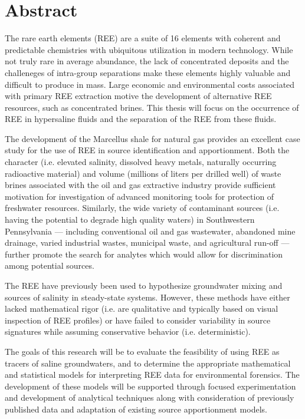 \chapter{Abstract}
The rare earth elements (REE) are a suite of 16 elements with coherent and predictable chemistries with ubiquitous utilization in modern technology.
While not truly rare in average abundance, the lack of concentrated deposits and the challeneges of intra-group separations make these elements highly valuable and difficult to produce in mass.
Large economic and environmental costs associated with primary REE extraction motive the development of alternative REE resources, such as concentrated brines.
This thesis will focus on the occurrence of REE in hypersaline fluids and the separation of the REE from these fluids.

The development of the Marcellus shale for natural gas provides an excellent case study for the use of REE in source identification and apportionment.
Both the character (i.e. elevated salinity, dissolved heavy metals, naturally occurring radioactive material) and volume (millions of liters per drilled well) of waste brines associated with the oil and gas extractive industry provide sufficient motivation for investigation of advanced monitoring tools for protection of freshwater resources.
Similarly, the wide variety of contaminant sources (i.e. having the potential to degrade high quality waters) in Southwestern Pennsylvania --- including conventional oil and gas wastewater, abandoned mine drainage, varied industrial wastes, municipal waste, and agricultural run-off --- further promote the search for analytes which would allow for discrimination among potential sources.

The REE have previously been used to hypothesize groundwater mixing and sources of salinity in steady-state systems.
However, these methods have either lacked mathematical rigor (i.e. are qualitative and typically based on visual inspection of REE profiles) or have failed to consider variability in source signatures while assuming conservative behavior (i.e. deterministic).

The goals of this research will be to evaluate the feasibility of using REE as tracers of saline groundwaters, and to determine the appropriate mathematical and statistical models for interpreting REE data for environmental forensics.
The development of these models will be supported through focused experimentation and development of analytical techniques along with consideration of previously published data and adaptation of existing source apportionment models.

